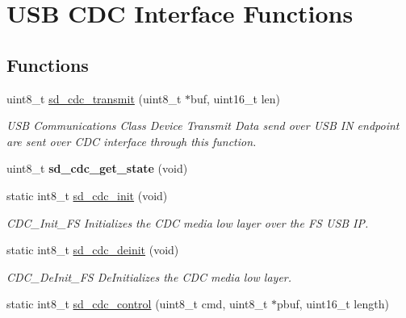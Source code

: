 \hypertarget{group___s_d___u_s_b___c_d_c___i_f___functions}{}\section{U\+SB C\+DC Interface Functions}
\label{group___s_d___u_s_b___c_d_c___i_f___functions}
\subsection*{Functions}
\begin{DoxyCompactItemize}
\item 
uint8\+\_\+t \mbox{\hyperlink{group___s_d___u_s_b___c_d_c___i_f___functions_gabd3573e5083061a52edc3dcd98e6f827}{sd\+\_\+cdc\+\_\+transmit}} (uint8\+\_\+t $\ast$buf, uint16\+\_\+t len)
\begin{DoxyCompactList}\small\item\em U\+SB Communications Class Device Transmit Data send over U\+SB IN endpoint are sent over C\+DC interface through this function. \end{DoxyCompactList}\item 
\mbox{\label{group___s_d___u_s_b___c_d_c___i_f___functions_ga583a2dd513f08c7f796c00581ec28643}} 
uint8\+\_\+t {\bfseries sd\+\_\+cdc\+\_\+get\+\_\+state} (void)
\item 
static int8\+\_\+t \mbox{\hyperlink{group___s_d___u_s_b___c_d_c___i_f___functions_ga9acc365b136914ed8a39593ee02d0260}{sd\+\_\+cdc\+\_\+init}} (void)
\begin{DoxyCompactList}\small\item\em C\+D\+C\+\_\+\+Init\+\_\+\+FS Initializes the C\+DC media low layer over the FS U\+SB IP. \end{DoxyCompactList}\item 
static int8\+\_\+t \mbox{\hyperlink{group___s_d___u_s_b___c_d_c___i_f___functions_gad9f46346272b91f23250ef22b6a1e600}{sd\+\_\+cdc\+\_\+deinit}} (void)
\begin{DoxyCompactList}\small\item\em C\+D\+C\+\_\+\+De\+Init\+\_\+\+FS De\+Initializes the C\+DC media low layer. \end{DoxyCompactList}\item 
static int8\+\_\+t \mbox{\hyperlink{group___s_d___u_s_b___c_d_c___i_f___functions_ga7c03942883325c01bc3fd6410d4d1911}{sd\+\_\+cdc\+\_\+control}} (uint8\+\_\+t cmd, uint8\+\_\+t $\ast$pbuf, uint16\+\_\+t length)

\end{DoxyCompactItemize}
